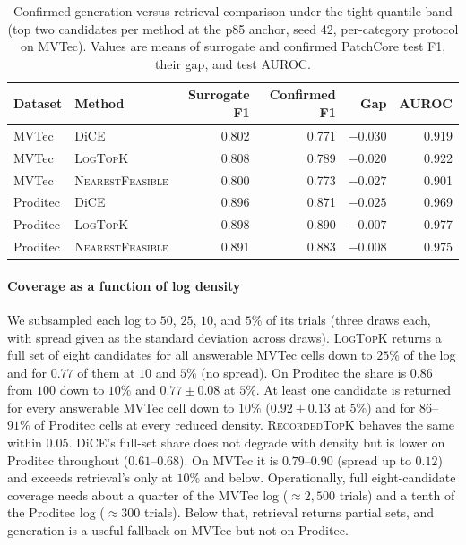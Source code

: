 \documentclass[final,5p,times,twocolumn]{elsarticle}
\begin{document}
\begin{table}[!t]
\centering
\footnotesize
\caption{Confirmed generation-versus-retrieval comparison under the
tight quantile band (top two candidates per method at the p85 anchor, seed 42, per-category protocol on MVTec). Values are means of surrogate and confirmed PatchCore test F1, their gap, and test AUROC.}
\label{tab:retrieval-confirmed}
\setlength{\tabcolsep}{2pt}
\begin{tabular}{@{}lp{}rrrr@{}}
\toprule
Dataset & Method & Surrogate F1 & Confirmed F1 & Gap & AUROC \\
\midrule
MVTec    & DiCE            & 0.802 & 0.771 & $-0.030$ & 0.919 \\
MVTec    & \textsc{LogTopK}         & 0.808 & 0.789 & $-0.020$ & 0.922 \\
MVTec    & \textsc{Nearest\-Feasible} & 0.800 & 0.773 & $-0.027$ & 0.901 \\
\midrule
Proditec & DiCE            & 0.896 & 0.871 & $-0.025$ & 0.969 \\
Proditec & \textsc{LogTopK}         & 0.898 & 0.890 & $-0.007$ & 0.977 \\
Proditec & \textsc{Nearest\-Feasible} & 0.891 & 0.883 & $-0.008$ & 0.975 \\
\bottomrule
\end{tabular}
\end{table}

\paragraph{Coverage as a function of log density}
We subsampled each log to $50$, $25$, $10$, and $5\%$ of its trials
(three draws each, with spread given as the standard deviation across draws). \textsc{LogTopK} returns a full set of eight candidates for all
answerable MVTec cells down to $25\%$ of the log and for $0.77$ of them
at $10$ and $5\%$ (no spread). On Proditec the share is $0.86$ from
$100$ down to $10\%$ and $0.77 \pm 0.08$ at $5\%$. At least one
candidate is returned for every answerable MVTec cell down to $10\%$
($0.92 \pm 0.13$ at $5\%$) and for $86$--$91\%$ of Proditec cells at every reduced density. \textsc{RecordedTopK} behaves the same within
$0.05$. DiCE's full-set share does not degrade with density but is
lower on Proditec throughout ($0.61$--$0.68$). On MVTec it is
$0.79$--$0.90$ (spread up to $0.12$) and exceeds retrieval's only at
$10\%$ and below. Operationally, full eight-candidate coverage needs
about a quarter of the MVTec log ($\approx 2{,}500$ trials) and a tenth
of the Proditec log ($\approx 300$ trials). Below that, retrieval returns
partial sets, and generation is a useful fallback on MVTec but not on
Proditec.
\end{document}
